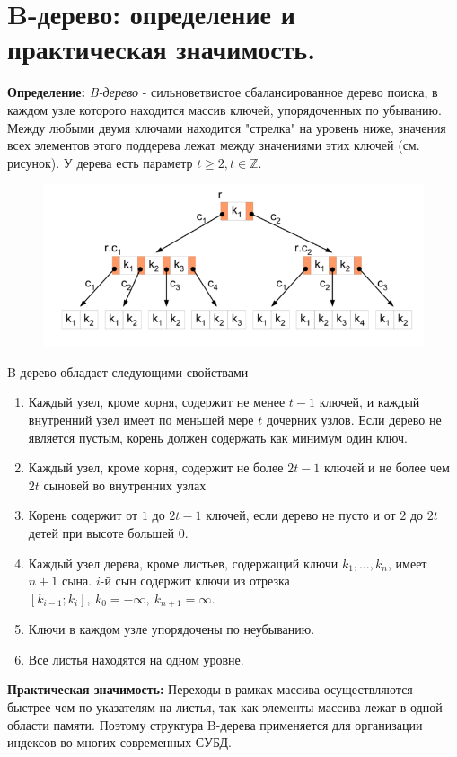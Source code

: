 \setcounter{section}{50}
\section{B-дерево: определение и практическая значимость.}
\par \textbf{Определение:} \textit{B-дерево} - сильноветвистое сбалансированное дерево поиска, в каждом узле которого находится массив ключей, упорядоченных по убыванию. Между любыми двумя ключами находится "стрелка" на уровень ниже, значения всех элементов этого поддерева лежат между значениями этих ключей (см. рисунок). У дерева есть параметр $t \geqslant 2, t \in \mathbb{Z}$.
\begin{figure} [h]
    \centering
    \includegraphics[scale=0.5]{images/51-54_b tree}
\end{figure}
\par B-дерево обладает следующими свойствами
\begin{enumerate}
    \item Каждый узел, кроме корня, содержит не менее $t - 1$ ключей, и каждый внутренний узел имеет по меньшей мере $t$ дочерних узлов. Если дерево не является пустым, корень должен содержать как минимум один ключ. 
    \item Каждый узел, кроме корня, содержит не более $2t - 1$ ключей и не более чем $2t$ сыновей во внутренних узлах
    \item Корень содержит от $1$ до $2t - 1$ ключей, если дерево не пусто и от $2$ до $2t$ детей при высоте большей $0$.
    \item Каждый узел дерева, кроме листьев, содержащий ключи $k_1, \ldots, k_n$, имеет $n + 1$ сына. $i$-й сын содержит ключи из отрезка $[k_{i - 1}; k_i],\:  k_0 = -\infty,\: k_{n + 1} = \infty$.
    \item Ключи в каждом узле упорядочены по неубыванию.
    \item Все листья находятся на одном уровне.
\end{enumerate}
\par \textbf{Практическая значимость:} Переходы в рамках массива осуществляются быстрее чем по указателям на листья, так как элементы массива лежат в одной области памяти. Поэтому структура B-дерева применяется для организации индексов во многих современных СУБД.
\\

